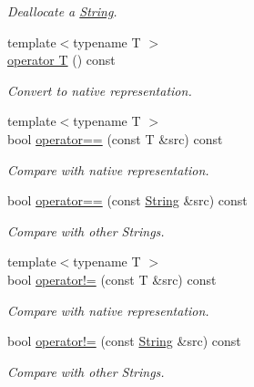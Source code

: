 \begin{DoxyCompactItemize}
\begin{DoxyCompactList}\small\item\em Deallocate a \hyperlink{classGUI_1_1String}{String}. \end{DoxyCompactList}\item 
{\footnotesize template$<$typename T $>$ }\\\hyperlink{classGUI_1_1String_a779a14fba54f0c4c75353581ce6fe6fd}{operator T} () const 
\begin{DoxyCompactList}\small\item\em Convert to native representation. \end{DoxyCompactList}\item 
\hypertarget{classGUI_1_1String_af3161a9deb32267e1e7906ffcf9e6b18}{{\footnotesize template$<$typename T $>$ }\\bool \hyperlink{classGUI_1_1String_af3161a9deb32267e1e7906ffcf9e6b18}{operator==} (const T \&src) const }\label{classGUI_1_1String_af3161a9deb32267e1e7906ffcf9e6b18}

\begin{DoxyCompactList}\small\item\em Compare with native representation. \end{DoxyCompactList}\item 
\hypertarget{classGUI_1_1String_a36fc4528094c80b4375f11f27581d830}{bool \hyperlink{classGUI_1_1String_a36fc4528094c80b4375f11f27581d830}{operator==} (const \hyperlink{classGUI_1_1String}{String} \&src) const }\label{classGUI_1_1String_a36fc4528094c80b4375f11f27581d830}

\begin{DoxyCompactList}\small\item\em Compare with other Strings. \end{DoxyCompactList}\item 
\hypertarget{classGUI_1_1String_ae9a9ed83e3a3bfc89a4503e3d1433b77}{{\footnotesize template$<$typename T $>$ }\\bool \hyperlink{classGUI_1_1String_ae9a9ed83e3a3bfc89a4503e3d1433b77}{operator!=} (const T \&src) const }\label{classGUI_1_1String_ae9a9ed83e3a3bfc89a4503e3d1433b77}

\begin{DoxyCompactList}\small\item\em Compare with native representation. \end{DoxyCompactList}\item 
\hypertarget{classGUI_1_1String_ae9fc4a45b2353174c7f78343a591b81a}{bool \hyperlink{classGUI_1_1String_ae9fc4a45b2353174c7f78343a591b81a}{operator!=} (const \hyperlink{classGUI_1_1String}{String} \&src) const }\label{classGUI_1_1String_ae9fc4a45b2353174c7f78343a591b81a}

\begin{DoxyCompactList}\small\item\em Compare with other Strings. \end{DoxyCompactList}\end{DoxyCompactItemize}
